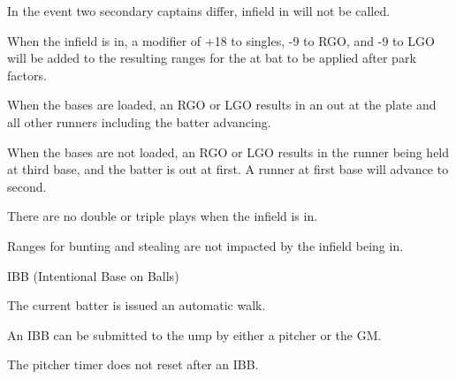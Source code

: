\begin{deepEnumerate}
\begin{deepEnumerate}
\begin{deepEnumerate}
\begin{deepEnumerate}
            	\item In the event two secondary captains differ, infield in will not be called.
			\end{deepEnumerate}
		\end{deepEnumerate}
        \item When the infield is in, a modifier of +18 to singles, -9 to RGO, and -9 to LGO 
        will be added to the resulting ranges for the at bat to be applied after park factors.
        \item When the bases are loaded, an RGO or LGO results in an out at the plate and all other runners including the batter advancing.
        \item When the bases are not loaded, an RGO or LGO results in the runner being held at third base, and the batter is out at first. 
        A runner at first base will advance to second.
        \item There are no double or triple plays when the infield is in. 
        \item Ranges for bunting and stealing are not impacted by the infield being in.
    \end{deepEnumerate}
    \item IBB (Intentional Base on Balls)
    \begin{deepEnumerate}
        \item The current batter is issued an automatic walk. 
        \item An IBB can be submitted to the ump by either a pitcher or the GM. 
        \item The pitcher timer does not reset after an IBB.
    \end{deepEnumerate}
\end{deepEnumerate}
